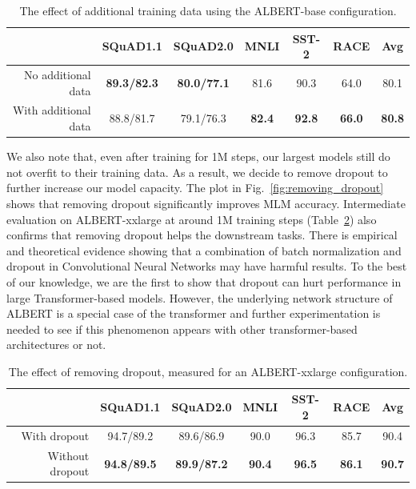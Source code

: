 \begin{table}[!htbp] 
\small
\centering
\begin{tabular}{ r |  c c c c c | c }
&SQuAD1.1	&SQuAD2.0	&MNLI	&SST-2	&RACE & Avg \\
\hline
No additional data      &\textbf{89.3/82.3}	&\textbf{80.0/77.1}	&81.6	&90.3	&64.0	&80.1\\
With additional data      &88.8/81.7	&79.1/76.3	&\textbf{82.4}	&\textbf{92.8}	&\textbf{66.0}	&\textbf{80.8}\\
\end{tabular}
\caption{The effect of additional training data using the ALBERT-base configuration.}
\label{table:additional_training_data}
\end{table}


We also note that, even after training for 1M steps, our largest models still do not overfit to their training data.
As a result, we decide to remove dropout to further increase our model capacity.
The plot in Fig.~\ref{fig:removing_dropout} shows that removing dropout significantly improves MLM accuracy.
Intermediate evaluation on ALBERT-xxlarge at around 1M training steps (Table~\ref{table:removing_dropout}) also confirms that removing dropout helps the downstream tasks.
There is empirical \citep{szegedy2017inception} and theoretical \citep{li2019understanding} evidence showing that a combination of batch normalization and dropout in Convolutional Neural Networks may have harmful results.
To the best of our knowledge, we are the first to show that dropout can hurt performance in large Transformer-based models. However, the underlying network structure of ALBERT is a special case of the transformer and further experimentation is needed to see if this phenomenon appears with other transformer-based architectures or not.

\begin{table}[!htbp] 
\small
\centering
\begin{tabular}{ r |  c c c c c | c }
&SQuAD1.1	&SQuAD2.0	&MNLI	&SST-2	&RACE & Avg \\
\hline
With dropout     &94.7/89.2	&89.6/86.9	&90.0	&96.3	&85.7	&90.4\\
Without dropout  &\textbf{94.8/89.5}	 &\textbf{89.9/87.2}	&\textbf{90.4}	&\textbf{96.5}	&\textbf{86.1}	&\textbf{90.7}\\
\end{tabular}
\caption{The effect of removing dropout, measured for an ALBERT-xxlarge configuration.}
\label{table:removing_dropout}
\end{table}


